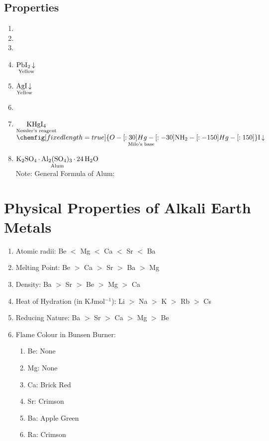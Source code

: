 \documentclass{article}
\begin{document}
\subsection{Properties}
\begin{enumerate}
  \item {}
  \item {}
  \item {}
  \item {}  $\underset{\text{Yellow}}{\ce{PbI2 v}}$
  \item {}  $\underset{\text{Yellow}}{\ce{AgI v}}$
  \item {}
  \item {} $\underset{\text{Nessler's reagent}}{\ce{KHgI4}}$ \ch{->[ NH3 \text{ or } NH4+ ] }$\underset{\text{Milo's base}}{\chemfig[fixed length
  = true]{O-[:30]Hg-[:-30]\ce{NH2}-[:-150]Hg-[:150]}\ce{I v}}$
  \item {}  $\underset{\text{Alum}}{\ce{K2SO4 * Al2(SO4)3 * 24 H2O}}$\\
  Note: General Formula of Alum: 
\end{enumerate}


\section{Physical Properties of Alkali Earth Metals}

\begin{enumerate}
  \item Atomic radii: Be $<$ Mg $<$ Ca $<$ Sr $<$ Ba
  \item Melting Point: Be $>$ Ca $>$ Sr $>$ Ba $>$ Mg
  \item Density: Ba $>$ Sr $>$ Be $>$ Mg $>$ Ca
  \item Heat of Hydration (in KJmol$^{-1}$): Li $>$ Na $>$ K $>$ Rb $>$ Cs
  \item Reducing Nature: Ba $>$ Sr $>$ Ca $>$ Mg $>$ Be
  \item Flame Colour in Bunsen Burner:
  \begin{enumerate}
    \item Be: None
    \item Mg: None
    \item Ca: Brick Red
    \item Sr: Crimson
    \item Ba: Apple Green
    \item Ra: Crimson
  \end{enumerate}
\end{enumerate}
\end{document}
